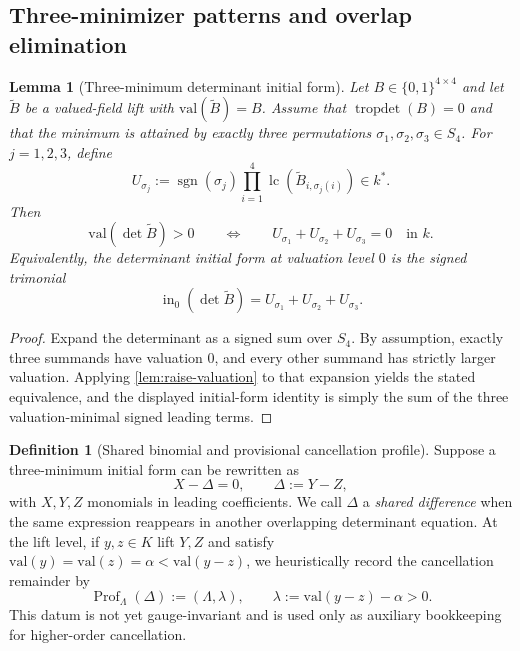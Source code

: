 \documentclass[11pt]{amsart}
\numberwithin{equation}{section}
\theoremstyle{plain}
\newtheorem{lemma}[theorem]{Lemma}
\theoremstyle{definition}
\newtheorem{definition}[theorem]{Definition}
\theoremstyle{remark}
\newcommand{\val}{\mathrm{val}}
\newcommand{\Lam}{\Lambda}
\begin{document}


\subsection{Three-minimizer patterns and overlap elimination}
\begin{lemma}[Three-minimum determinant initial form]
\label{lem:three-min-initial-form}
Let $B\in\{0,1\}^{4\times4}$ and let $\widetilde B$ be a valued-field lift with $\val(\widetilde B)=B$.
Assume that $\operatorname{tropdet}(B)=0$ and that the minimum is attained by exactly three permutations
$\sigma_1,\sigma_2,\sigma_3\in S_4$.
For $j=1,2,3$, define
\[
U_{\sigma_j}:=\operatorname{sgn}(\sigma_j)\prod_{i=1}^4 \operatorname{lc}(\widetilde B_{i,\sigma_j(i)})\in k^*.
\]
Then
\[
\val(\det \widetilde B)>0
\qquad\Longleftrightarrow\qquad
U_{\sigma_1}+U_{\sigma_2}+U_{\sigma_3}=0
\quad\text{in }k.
\]
Equivalently, the determinant initial form at valuation level $0$ is the signed trimonial
\[
\operatorname{in}_{0}(\det \widetilde B)=U_{\sigma_1}+U_{\sigma_2}+U_{\sigma_3}.
\]
\end{lemma}

\begin{proof}
Expand the determinant as a signed sum over $S_4$. By assumption, exactly three summands have valuation $0$, and every other summand has
strictly larger valuation. Applying \cref{lem:raise-valuation} to that expansion yields the stated equivalence, and the displayed
initial-form identity is simply the sum of the three valuation-minimal signed leading terms.
\end{proof}

\begin{definition}[Shared binomial and provisional cancellation profile]
Suppose a three-minimum initial form can be rewritten as
\[
X-\Delta=0,
\qquad
\Delta:=Y-Z,
\]
with $X,Y,Z$ monomials in leading coefficients.
We call $\Delta$ a \emph{shared difference} when the same expression reappears in another overlapping determinant equation.
At the lift level, if $y,z\in K$ lift $Y,Z$ and satisfy $\val(y)=\val(z)=\alpha<\val(y-z)$, we heuristically record the
cancellation remainder by
\[
\operatorname{Prof}_{\Lambda}(\Delta):=(\Lam,\lambda),
\qquad
\lambda:=\val(y-z)-\alpha>0.
\]
This datum is not yet gauge-invariant and is used only as auxiliary bookkeeping for higher-order cancellation.
\end{definition}
\end{document}
